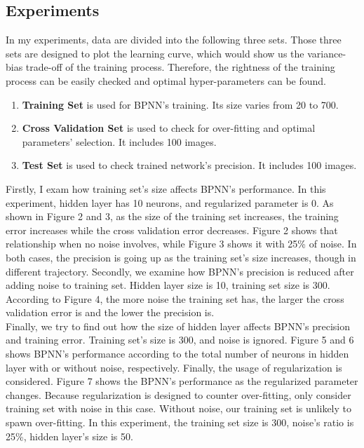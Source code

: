\documentclass[a4paper, 11pt]{article}
\begin{document}
\subsection{Experiments}
In my experiments, data are divided into the following three sets. Those three sets are designed to plot the learning curve, which would show us the variance-bias trade-off of the training process. Therefore, the rightness of the training process can be easily checked and optimal hyper-parameters can be found.
\begin{enumerate}
\item \textbf{Training Set} is used for BPNN's training. Its size varies from 20 to 700.
\item \textbf{Cross Validation Set} is used to check for over-fitting and optimal parameters' selection. It includes 100 images.
\item \textbf{Test Set} is used to check trained network's precision. It includes 100 images.
\end{enumerate}
Firstly, I exam how training set's size affects BPNN's performance. In this experiment, hidden layer has 10 neurons, and regularized parameter is 0. As shown in Figure 2 and 3, as the size of the training set increases, the training error increases while the cross validation error decreases. Figure 2 shows that relationship when no noise involves, while Figure 3 shows it with 25\% of noise. In both cases, the precision is going up as the training set's size increases, though in different trajectory.
Secondly, we examine how BPNN's precision is reduced after adding noise to training set. Hidden layer size is 10, training set size is 300. According to Figure 4, the more noise the training set has, the larger the cross validation error is and the lower the precision is. \\
Finally, we try to find out how the size of hidden layer affects BPNN's precision and training error. Training set's size is 300, and noise is ignored. Figure 5 and 6 shows BPNN's performance according to the total number of neurons in hidden layer with or without noise, respectively.
Finally, the usage of regularization is considered. Figure 7 shows the BPNN's performance as the regularized parameter changes. Because regularization is designed to counter over-fitting, only consider training set with noise in this case. Without noise, our training set is unlikely to spawn over-fitting. In this experiment, the training set size is 300, noise's ratio is 25\%, hidden layer's size is 50. 
\end{document}
